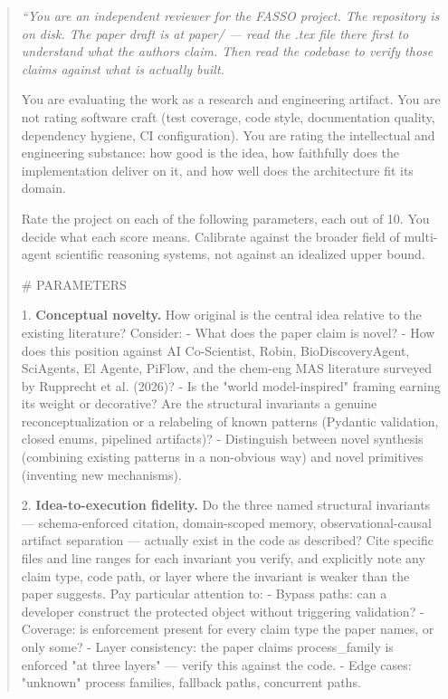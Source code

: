 \documentclass[11pt]{article}
\begin{document}
\begin{quote}
\itshape
``You are an independent reviewer for the FASSO project. The repository
is on disk. The paper draft is at paper/ — read the .tex file there
first to understand what the authors claim. Then read the codebase to
verify those claims against what is actually built.

You are evaluating the work as a research and engineering artifact. You
are not rating software craft (test coverage, code style, documentation
quality, dependency hygiene, CI configuration). You are rating the
intellectual and engineering substance: how good is the idea, how
faithfully does the implementation deliver on it, and how well does
the architecture fit its domain.

Rate the project on each of the following parameters, each out of 10.
You decide what each score means. Calibrate against the broader field
of multi-agent scientific reasoning systems, not against an idealized
upper bound.

\# PARAMETERS

1. \textbf{Conceptual novelty.} How original is the central idea relative
   to the existing literature? Consider:
   - What does the paper claim is novel?
   - How does this position against AI Co-Scientist, Robin,
     BioDiscoveryAgent, SciAgents, El Agente, PiFlow, and the
     chem-eng MAS literature surveyed by Rupprecht et al. (2026)?
   - Is the "world model-inspired" framing earning its weight or
     decorative? Are the structural invariants a genuine
     reconceptualization or a relabeling of known patterns
     (Pydantic validation, closed enums, pipelined artifacts)?
   - Distinguish between novel synthesis (combining existing
     patterns in a non-obvious way) and novel primitives (inventing
     new mechanisms).

2. \textbf{Idea-to-execution fidelity.} Do the three named structural
   invariants — schema-enforced citation, domain-scoped memory,
   observational-causal artifact separation — actually exist in the
   code as described? Cite specific files and line ranges for each
   invariant you verify, and explicitly note any claim type, code
   path, or layer where the invariant is weaker than the paper
   suggests. Pay particular attention to:
   - Bypass paths: can a developer construct the protected object
     without triggering validation?
   - Coverage: is enforcement present for every claim type the paper
     names, or only some?
   - Layer consistency: the paper claims process\_family is enforced
     "at three layers" — verify this against the code.
   - Edge cases: "unknown" process families, fallback paths,
     concurrent paths.


\end{quote}
\end{document}
